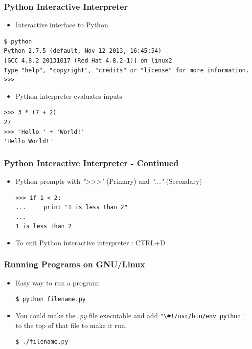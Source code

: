 \documentclass[12pt,handout]{beamer}
\newcommand{\code}[1]{\lstinline{#1}}
\begin{document}
\begin{frame}[fragile]
\frametitle{Python Interactive Interpreter}

\begin{itemize}
\item Interactive interface to Python
\end{itemize}

\small{
\begin{verbatim}
$ python
Python 2.7.5 (default, Nov 12 2013, 16:45:54)
[GCC 4.8.2 20131017 (Red Hat 4.8.2-1)] on linux2
Type "help", "copyright", "credits" or "license" for more information.
>>>
\end{verbatim}
}

\begin{itemize}
\item Python interpreter evaluates inputs
\end{itemize}

\small{
\begin{verbatim}
>>> 3 * (7 + 2)
27
>>> 'Hello ' + 'World!'
'Hello World!'
\end{verbatim}
}
\end{frame}

\begin{frame}[fragile]
\frametitle{Python Interactive Interpreter - Continued}

\begin{itemize}

\item Python prompts with {\it ">>>"} (Primary) and {\it "..."} (Secondary)

\small{
\begin{verbatim}
>>> if 1 < 2:
...     print "1 is less than 2"
...
1 is less than 2
\end{verbatim}
}

\item To exit Python interactive interpreter :  CTRL+D

\end{itemize}
\end{frame}

\begin{frame}[fragile]
\frametitle{Running Programs on GNU/Linux}

\begin{itemize}
\item Easy way to run a program:

\small{
\begin{verbatim}
$ python filename.py
\end{verbatim}
}

\item You could make the {\it *.py} file executable and add
  \code{"\#!/usr/bin/env python"} to the top of that file to make it
  run.

\small{
\begin{verbatim}
$ ./filename.py
\end{verbatim}
}

\end{itemize}

\end{frame}
\end{document}
